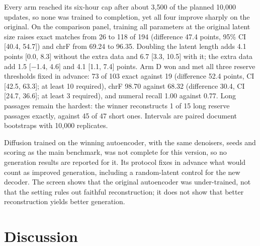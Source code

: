 \documentclass[11pt,a4paper]{article}
\begin{document}
Every arm reached its six-hour cap after about 3,500 of the planned 10,000 updates, so none was trained to completion, yet all four improve sharply on the original. On the comparison panel, training all parameters at the original latent size raises exact matches from 26 to 118 of 194 (difference 47.4 points, 95\% CI [40.4, 54.7]) and chrF from 69.24 to 96.35. Doubling the latent length adds 4.1 points [0.0, 8.3] without the extra data and 6.7 [3.3, 10.5] with it; the extra data add 1.5 [$-$1.4, 4.6] and 4.1 [1.1, 7.4] points. Arm D won and met all three reserve thresholds fixed in advance: 73 of 103 exact against 19 (difference 52.4 points, CI [42.5, 63.3]; at least 10 required), chrF 98.70 against 68.32 (difference 30.4, CI [24.7, 36.6]; at least 3 required), and numeral recall 1.00 against 0.77. Long passages remain the hardest: the winner reconstructs 1 of 15 long reserve passages exactly, against 45 of 47 short ones. Intervals are paired document bootstraps with 10,000 replicates.

Diffusion trained on the winning autoencoder, with the same denoisers, seeds and scoring as the main benchmark, was not complete for this version, so no generation results are reported for it. Its protocol fixes in advance what would count as improved generation, including a random-latent control for the new decoder. The screen shows that the original autoencoder was under-trained, not that the setting rules out faithful reconstruction; it does not show that better reconstruction yields better generation.

\section{Discussion}
\label{sec:discussion}
\end{document}
